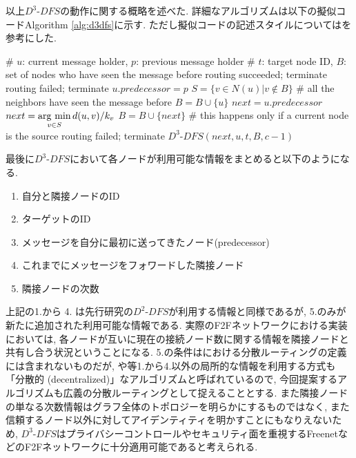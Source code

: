 \documentclass[dvipdfmx]{ampbt}
\newcommand{\argmin}{\mathop{\rm arg~min}\limits}
\begin{document}
以上$D^3$-$DFS$の動作に関する概略を述べた. 詳細なアルゴリズムは以下の擬似コードAlgorithm \ref{alg:d3dfs}に示す. ただし擬似コードの記述スタイルについては\cite{roos2013contribution}を参考にした.
   \begin{algorithm}[!h]
    \caption{$D^3$-$DFS(\textrm{Node } u,\textrm{ Node } p, \textrm{ ID } t,\textrm{ Set }B, \textrm{ TTL }c$)}\label{alg:d3dfs}
    \begin{algorithmic}[1]
     \State \# $u$: current message holder, $p$: previous message holder
     \State \# $t$: target node ID, $B$: set of nodes who have seen the message before
     \State \textrm{routing succeeded; terminate}
     \EndIf
     \State \textrm{routing failed; terminate}
     \EndIf
     \State $u.predecessor = p$
     \EndIf
     \State $S = \{v \in N(u) |  v \notin B \}$
      \# all the neighbors have seen the message before
     \State $B = B \cup \{u\}$
     \State $next = u.predecessor$
     \Else
     \State $next = \argmin_{v \in S} d(u, v)/k_v$
     \State $B = B \cup \{ next\}$
     \EndIf
      \# this happens only if a current node is the source
     \State \textrm{routing failed; terminate}
     \Else
     \State $D^3$-$DFS(next, u, t, B, c-1)$
     \EndIf
    \end{algorithmic}
   \end{algorithm}

最後に$D^3$-$DFS$において各ノードが利用可能な情報をまとめると以下のようになる.
\begin{enumerate}
 \item 自分と隣接ノードのID
 \item ターゲットのID
 \item メッセージを自分に最初に送ってきたノード(predecessor)
 \item これまでにメッセージをフォワードした隣接ノード
 \item 隣接ノードの次数
\end{enumerate}

上記の1.から 4. は先行研究の$D^2$-$DFS$が利用する情報と同様であるが, 5.のみが新たに追加された利用可能な情報である. 実際のF2Fネットワークにおける実装においては, 各ノードが互いに現在の接続ノード数に関する情報を隣接ノードと共有し合う状況ということになる. 5.の条件は\cite{kleinberg2000small}における分散ルーティングの定義には含まれないものだが, \cite{manku2004know}や\cite{lebhar2004almost}等1.から4.以外の局所的な情報を利用する方式も「分散的 (decentralized)」なアルゴリズムと呼ばれているので, 今回提案するアルゴリズムも広義の分散ルーティングとして捉えることとする. また隣接ノードの単なる次数情報はグラフ全体のトポロジーを明らかにするものではなく, また信頼するノード以外に対してアイデンティティを明かすことにもなりえないため, $D^3$-$DFS$はプライバシーコントロールやセキュリティ面を重視するFreenetなどのF2Fネットワークに十分適用可能であると考えられる. \newline
\end{document}
